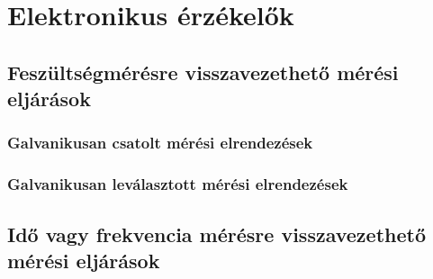 \section{Elektronikus érzékelők}
\vspace{5cm}
\subsection{Feszültségmérésre visszavezethető mérési eljárások}










\subsubsection{Galvanikusan csatolt mérési elrendezések}




\subsubsection{Galvanikusan leválasztott mérési elrendezések}











\subsection{Idő vagy frekvencia mérésre visszavezethető mérési eljárások}










\vspace{-1.5mm}
\newpage